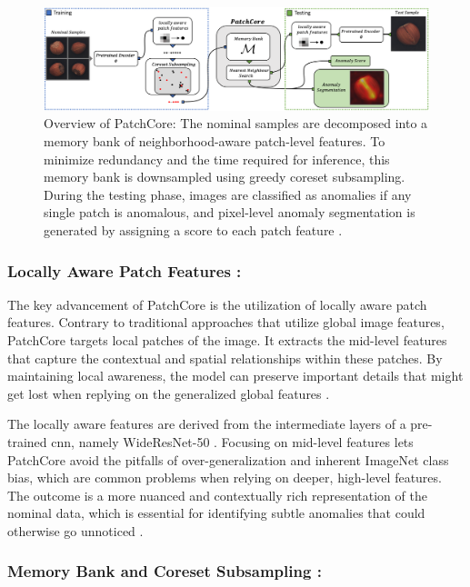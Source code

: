 \begin{figure}[ht!]
    \centering
    \includegraphics[width=1.1\textwidth]{Rohit_Master_Thesis//Images/patchcore_architecture_figure.png}
    \caption{Overview of PatchCore: The nominal samples are decomposed into a memory bank of neighborhood-aware patch-level features. To minimize redundancy and the time required for inference, this memory bank is downsampled using greedy coreset subsampling. During the testing phase, images are classified as anomalies if any single patch is anomalous, and pixel-level anomaly segmentation is generated by assigning a score to each patch feature \cite{roth2022totalrecallindustrialanomaly}.}
    \label{fig:patchcore architecture}
\end{figure}

\subsubsection*{Locally Aware Patch Features :} 
The key advancement of PatchCore is the utilization of locally aware patch features. Contrary to traditional approaches that utilize global image features, PatchCore targets local patches of the image. It extracts the mid-level features that capture the contextual and spatial relationships within these patches. By maintaining local awareness, the model can preserve important details that might get lost when replying on the generalized global features \cite{roth2022totalrecallindustrialanomaly}.

The locally aware features are derived from the intermediate layers of a pre-trained \gls{cnn}, namely WideResNet-50 \cite{zagoruyko2017wideresidualnetworks}. Focusing on mid-level features lets PatchCore avoid the pitfalls of over-generalization and inherent ImageNet class bias, which are common problems when relying on deeper, high-level features. The outcome is a more nuanced and contextually rich representation of the nominal data, which is essential for identifying subtle anomalies that could otherwise go unnoticed \cite{roth2022totalrecallindustrialanomaly}.

\subsubsection*{Memory Bank and Coreset Subsampling :}

